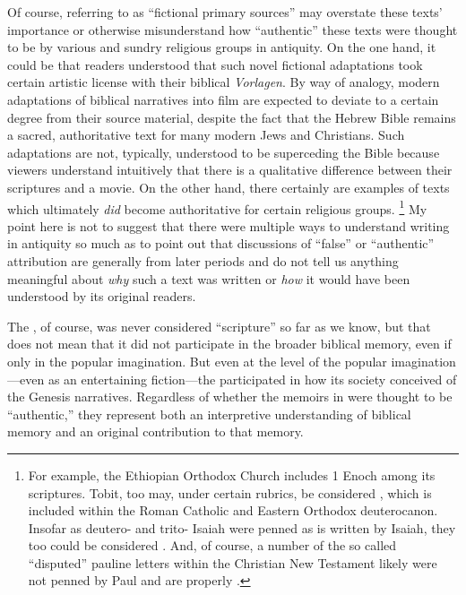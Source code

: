 Of course, referring to \psy as ``fictional primary sources'' may overstate these texts' importance or otherwise misunderstand how ``authentic'' these texts were thought to be by various and sundry religious groups in antiquity. On the one hand, it could be that readers understood that such novel fictional adaptations took certain artistic license with their biblical \emph{Vorlagen}. By way of analogy, modern adaptations of biblical narratives into film are expected to deviate to a certain degree from their source material, despite the fact that the Hebrew Bible remains a sacred, authoritative text for many modern Jews and Christians. Such adaptations are not, typically, understood to be superceding the Bible because viewers understand intuitively that there is a qualitative difference between their scriptures and a movie. On the other hand, there certainly are examples of \psgraphical texts which ultimately \emph{did} become authoritative for certain religious groups.%
%
\footnote{For example, the Ethiopian Orthodox Church includes 1 Enoch among its scriptures. Tobit, too may, under certain rubrics, be considered \psa, which is included within the Roman Catholic and Eastern Orthodox deuterocanon. Insofar as deutero- and trito- Isaiah were penned as is written by Isaiah, they too could be considered \psa. And, of course, a number of the so called ``disputed'' pauline letters within the Christian New Testament likely were not penned by Paul and are properly \psgraphical.}
%
My point here is not to suggest that there were multiple ways to understand \psgraphical writing in antiquity so much as to point out that discussions of ``false'' or ``authentic'' attribution are generally from later periods and do not tell us anything meaningful about \emph{why} such a text was written or \emph{how} it would have been understood by its original readers.

The \ga, of course, was never considered ``scripture'' so far as we know, but that does not mean that it did not participate in the broader biblical memory, even if only in the popular imagination. But even at the level of the popular imagination---even as an entertaining fiction---the \ga participated in how its society conceived of the Genesis narratives. Regardless of whether the memoirs in \ga were thought to be ``authentic,'' they represent both an interpretive understanding of biblical memory and an original contribution to that memory.